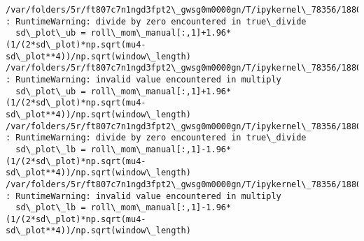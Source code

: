 \documentclass[11pt]{article}
\begin{document}
    \begin{Verbatim}[commandchars=\\\{\}]
/var/folders/5r/ft807c7n1ngd3fpt2\_gwsg0m0000gn/T/ipykernel\_78356/1880708915.py:4
: RuntimeWarning: divide by zero encountered in true\_divide
  sd\_plot\_ub = roll\_mom\_manual[:,1]+1.96*(1/(2*sd\_plot)*np.sqrt(mu4-
sd\_plot**4))/np.sqrt(window\_length)
/var/folders/5r/ft807c7n1ngd3fpt2\_gwsg0m0000gn/T/ipykernel\_78356/1880708915.py:4
: RuntimeWarning: invalid value encountered in multiply
  sd\_plot\_ub = roll\_mom\_manual[:,1]+1.96*(1/(2*sd\_plot)*np.sqrt(mu4-
sd\_plot**4))/np.sqrt(window\_length)
/var/folders/5r/ft807c7n1ngd3fpt2\_gwsg0m0000gn/T/ipykernel\_78356/1880708915.py:5
: RuntimeWarning: divide by zero encountered in true\_divide
  sd\_plot\_lb = roll\_mom\_manual[:,1]-1.96*(1/(2*sd\_plot)*np.sqrt(mu4-
sd\_plot**4))/np.sqrt(window\_length)
/var/folders/5r/ft807c7n1ngd3fpt2\_gwsg0m0000gn/T/ipykernel\_78356/1880708915.py:5
: RuntimeWarning: invalid value encountered in multiply
  sd\_plot\_lb = roll\_mom\_manual[:,1]-1.96*(1/(2*sd\_plot)*np.sqrt(mu4-
sd\_plot**4))/np.sqrt(window\_length)
    \end{Verbatim}

    \begin{center}
    \end{center}
    { \hspace*{\fill} \\}
    
\end{document}
